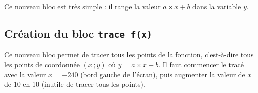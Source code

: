 Ce nouveau bloc est très simple : il range la valeur $a \times x + b$ dans la variable $y$.




\subsection{Création du bloc \texttt{trace f(x)}}


Ce nouveau bloc permet de tracer tous les points de la fonction, c'est-à-dire tous les points de coordonnée $(x\,;y)$ où $y=a\times x + b$. Il faut commencer le tracé avec la valeur $x=-240$ (bord gauche de l'écran), puis augmenter la valeur de $x$ de 10 en 10 (inutile de tracer tous les points).







